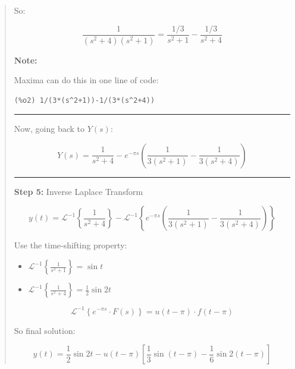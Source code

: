 \documentclass[
  letterpaper,
  DIV=11,
  numbers=noendperiod]{scrreprt}
\newenvironment{Shaded}{\begin{snugshade}}{\end{snugshade}}
\newcommand{\ConstantTok}[1]{\textcolor[rgb]{0.56,0.35,0.01}{#1}}
\newcommand{\DecValTok}[1]{\textcolor[rgb]{0.68,0.00,0.00}{#1}}
\newcommand{\FunctionTok}[1]{\textcolor[rgb]{0.28,0.35,0.67}{#1}}
\newcommand{\NormalTok}[1]{\textcolor[rgb]{0.00,0.23,0.31}{#1}}
\providecommand{\tightlist}{%
  \setlength{\itemsep}{0pt}\setlength{\parskip}{0pt}}
\theoremstyle{plain}
\theoremstyle{remark}
\begin{document}
\begin{tcolorbox}
\begin{quote}
So:

\[
\frac{1}{(s^2 + 4)(s^2 + 1)} = \frac{1/3}{s^2 + 1} - \frac{1/3}{s^2 + 4}
\]

\textbf{Note:}

Maxima can do this in one line of code:

\begin{Shaded}
\end{Shaded}

\begin{verbatim}
(%o2) 1/(3*(s^2+1))-1/(3*(s^2+4))
\end{verbatim}

\begin{center}\rule{0.5\linewidth}{0.5pt}\end{center}

Now, going back to \(Y(s)\):

\[
Y(s) = \frac{1}{s^2 + 4} - e^{-\pi s} \left( \frac{1}{3(s^2 + 1)} - \frac{1}{3(s^2 + 4)} \right)
\]

\begin{center}\rule{0.5\linewidth}{0.5pt}\end{center}

\textbf{Step 5:} Inverse Laplace Transform

\[
y(t) = \mathcal{L}^{-1}\left\{ \frac{1}{s^2 + 4} \right\} - \mathcal{L}^{-1}\left\{ e^{-\pi s} \left( \frac{1}{3(s^2 + 1)} - \frac{1}{3(s^2 + 4)} \right) \right\}
\]

Use the time-shifting property:

\begin{itemize}
\tightlist
\item
  \(\mathcal{L}^{-1} \left\{ \frac{1}{s^2 + 1} \right\} = \sin t\)
\item
  \(\mathcal{L}^{-1} \left\{ \frac{1}{s^2 + 4} \right\} = \frac{1}{2} \sin 2t\)
\end{itemize}

\[
\mathcal{L}^{-1} \left\{ e^{-\pi s} \cdot F(s) \right\} = u(t - \pi) \cdot f(t - \pi)
\]

So final solution:

\[
\boxed{
y(t) = \frac{1}{2} \sin 2t - u(t - \pi) \left[ \frac{1}{3} \sin(t - \pi) - \frac{1}{6} \sin 2(t - \pi) \right]
}
\]
\end{quote}

\end{tcolorbox}
\end{document}
